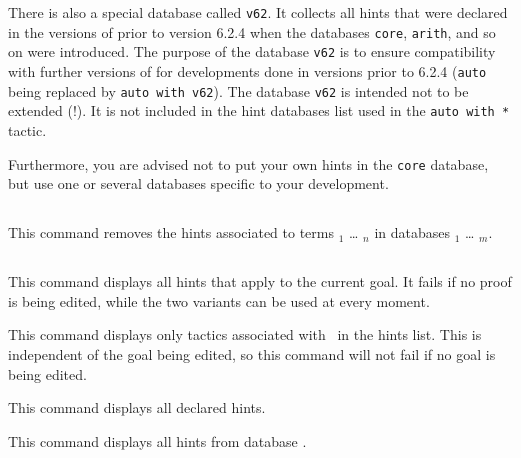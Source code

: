 There is also a special database called {\tt v62}. It collects all
hints that were declared in the versions of {\Coq} prior to version
6.2.4 when the databases {\tt core}, {\tt arith}, and so on were
introduced.  The purpose of the database {\tt v62} is to ensure
compatibility with further versions of {\Coq} for developments done in
versions prior to 6.2.4 ({\tt auto} being replaced by {\tt auto with v62}).
The database {\tt v62} is intended not to be extended (!). It is not
included in the hint databases list used in the {\tt auto with *} tactic.

Furthermore, you are advised not to put your own hints in the
{\tt core} database, but use one or several databases specific to your
development.

\subsection{}
\label{RemoveHints}

This command removes the hints associated to terms \term$_1$ \mbox{\dots}
\term$_n$ in databases \ident$_1$ \mbox{\dots} \ident$_m$.

\subsection{}
\label{PrintHint}

This command displays all hints that apply to the current goal. It
fails if no proof is being edited, while the two variants can be used at
every moment.

\begin{Variants}

\item {}

 This command displays only tactics associated with \ident\ in the
 hints list. This is independent of the goal being edited, so this
 command will not fail if no goal is being edited.

\item {}

  This command displays all declared hints.

\item {}
\label{PrintHintDb}

 This command displays all hints from database \ident.

\end{Variants}

